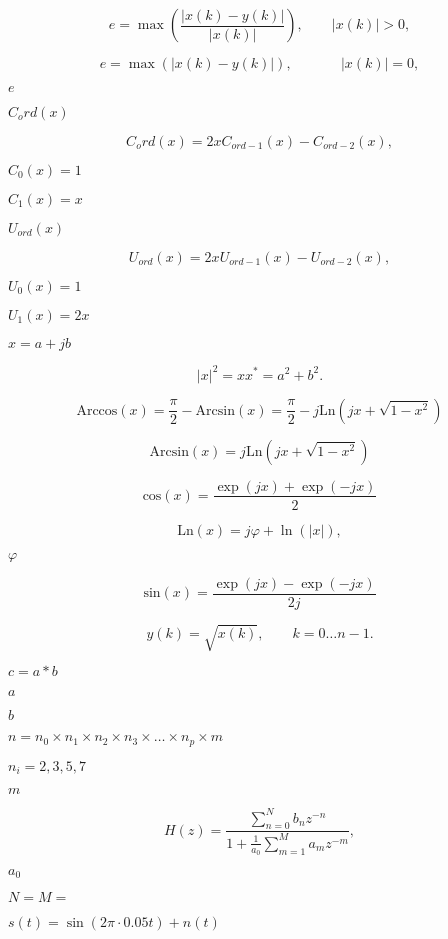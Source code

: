 \documentclass{article}
\begin{document}
\[ e = \max \left( \frac{|x(k) - y(k)| }{ |x(k)|} \right), \quad \quad |x(k)| > 0, \]
\pagebreak

\[ e = \max(|x(k) - y(k)| ), ~\qquad \quad~|x(k)| = 0, \]
\pagebreak

$ e$
\pagebreak

$ C_ord(x)$
\pagebreak

\[ C_ord(x) = 2 x C_{ord-1}(x) - C_{ord-2}(x), \]
\pagebreak

$ C_0(x) = 1 $
\pagebreak

$ C_1(x) = x$
\pagebreak

$ U_{ord}(x)$
\pagebreak

\[ U_{ord}(x) = 2 x U_{ord-1}(x) - U_{ord-2}(x), \]
\pagebreak

$ U_0(x) = 1 $
\pagebreak

$ U_1(x) = 2x$
\pagebreak

$ x = a + j b $
\pagebreak

\[ |x|^2 = x x^* = a^2 + b^2. \]
\pagebreak

\[ \textrm{Arccos}(x) = \frac{\pi}{2} - \textrm{Arcsin}(x) = \frac{\pi}{2} -j \textrm{Ln}\left( j x + \sqrt{1 - x^2} \right) \]
\pagebreak

\[ \textrm{Arcsin}(x) = j \textrm{Ln}\left( j x + \sqrt{1 - x^2} \right) \]
\pagebreak

\[ \textrm{cos}(x) = \frac{\exp(jx) + \exp(-jx)}{2} \]
\pagebreak

\[ \textrm{Ln}(x) = j \varphi + \ln(|x|), \]
\pagebreak

$\varphi$
\pagebreak

\[ \textrm{sin}(x) = \frac{\exp(jx) - \exp(-jx)}{2j} \]
\pagebreak

\[ y(k) = \sqrt{x(k)}, \qquad k = 0 \ldots n-1. \]
\pagebreak

$ c = a * b$
\pagebreak

$a$
\pagebreak

$b$
\pagebreak

$n = n_0 \times n_1 \times n_2 \times n_3 \times \ldots \times n_p \times m$
\pagebreak

$n_i = 2,3,5,7$
\pagebreak

$m $
\pagebreak

\[ H(z) = \frac{\sum_{n = 0}^{N} b_n z^{-n}} {1+{\frac{1}{a_0}}\sum_{m = 1}^{M} a_m z^{-m}}, \]
\pagebreak

$a_0$
\pagebreak

$N=M=$
\pagebreak

$s(t) = \sin(2\pi \cdot 0.05 t) + n(t)$
\pagebreak
\end{document}
